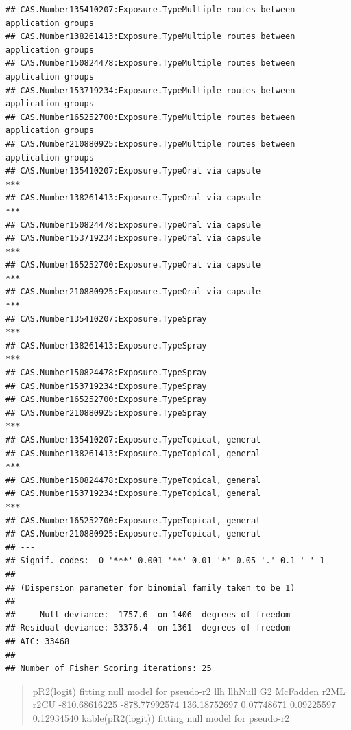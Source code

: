 \documentclass[
  12pt,
]{article}
\begin{document}
\begin{verbatim}
## CAS.Number135410207:Exposure.TypeMultiple routes between application groups    
## CAS.Number138261413:Exposure.TypeMultiple routes between application groups    
## CAS.Number150824478:Exposure.TypeMultiple routes between application groups    
## CAS.Number153719234:Exposure.TypeMultiple routes between application groups    
## CAS.Number165252700:Exposure.TypeMultiple routes between application groups    
## CAS.Number210880925:Exposure.TypeMultiple routes between application groups    
## CAS.Number135410207:Exposure.TypeOral via capsule                           ***
## CAS.Number138261413:Exposure.TypeOral via capsule                           ***
## CAS.Number150824478:Exposure.TypeOral via capsule                              
## CAS.Number153719234:Exposure.TypeOral via capsule                           ***
## CAS.Number165252700:Exposure.TypeOral via capsule                           ***
## CAS.Number210880925:Exposure.TypeOral via capsule                           ***
## CAS.Number135410207:Exposure.TypeSpray                                      ***
## CAS.Number138261413:Exposure.TypeSpray                                      ***
## CAS.Number150824478:Exposure.TypeSpray                                         
## CAS.Number153719234:Exposure.TypeSpray                                         
## CAS.Number165252700:Exposure.TypeSpray                                         
## CAS.Number210880925:Exposure.TypeSpray                                      ***
## CAS.Number135410207:Exposure.TypeTopical, general                              
## CAS.Number138261413:Exposure.TypeTopical, general                           ***
## CAS.Number150824478:Exposure.TypeTopical, general                              
## CAS.Number153719234:Exposure.TypeTopical, general                           ***
## CAS.Number165252700:Exposure.TypeTopical, general                              
## CAS.Number210880925:Exposure.TypeTopical, general                              
## ---
## Signif. codes:  0 '***' 0.001 '**' 0.01 '*' 0.05 '.' 0.1 ' ' 1
## 
## (Dispersion parameter for binomial family taken to be 1)
## 
##     Null deviance:  1757.6  on 1406  degrees of freedom
## Residual deviance: 33376.4  on 1361  degrees of freedom
## AIC: 33468
## 
## Number of Fisher Scoring iterations: 25
\end{verbatim}

\begin{quote}
pR2(logit) fitting null model for pseudo-r2 llh llhNull G2 McFadden r2ML
r2CU -810.68616225 -878.77992574 136.18752697 0.07748671 0.09225597
0.12934540 kable(pR2(logit)) fitting null model for pseudo-r2
\end{quote}
\end{document}

